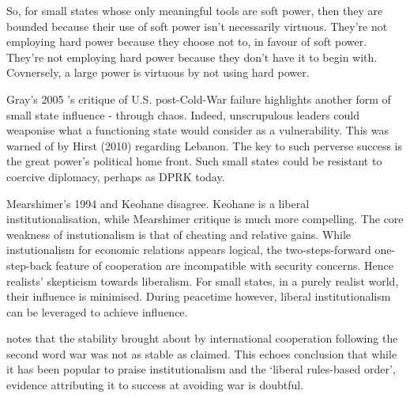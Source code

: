 So, for small states whose only meaningful tools are soft power, then they are bounded because their use of soft power isn't necessarily virtuous. They're not employing hard power because they choose not to, in favour of soft power. They're not employing hard power because they don't have it to begin with. Covnersely, a large power is virtuous by not using hard power.


Gray's 2005 \nocite{GRAY_2005}'s critique of U.S. post-Cold-War failure highlights another form of small state influence - through chaos. Indeed, unscrupulous leaders could weaponise what a functioning state would consider as a vulnerability. This was warned of by Hirst (2010) \nocite{HIRST_2010} regarding Lebanon. The key to such perverse success is the great power's political home front. Such small states could be resistant to coercive diplomacy, perhaps as DPRK today.

Mearshimer's 1994 \nocite{MEARSHIMER_1994} and Keohane \nocite{KEOHANE_1969} disagree. Keohane is a liberal institutionalisation, while Mearshimer critique is much more compelling. The core weakness of instutionalism is that of cheating and relative gains. While instutionalism for economic relations appears logical, the two-steps-forward one-step-back feature of cooperation are incompatible with security concerns. Hence realists' skepticism towards liberalism. For small states, in a purely realist world, their influence is minimised. During peacetime however, liberal institutionalism can be leveraged to achieve influence. 


\textcite{HINTON_2020} notes that the stability brought about by international cooperation following the second word war was not as stable as claimed. This echoes \textcite{MEARSHEIMER_1994} conclusion that while it has been popular to praise institutionalism and the `liberal rules-based order', evidence attributing it to success at avoiding war is doubtful.

